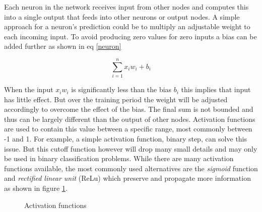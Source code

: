 \documentclass[proposal]{softeng}
\begin{document}
Each neuron in the network receives input from other nodes and computes this into a single output that feeds into other neurons or output nodes. A simple approach for a neuron's prediction could be to multiply an adjustable weight to each incoming input. To avoid producing zero values for zero inputs a bias can be added further as shown in eq  \ref{neuron}

\begin{equation}
\label{neuron}
 \sum_{i=1}^{n} {x_{i}} {w_{i}} + {b_{i}}  
\end{equation}



When the input \( {x_{i}} {w_{i}} \) is significantly less than the bias \({b_{i}}\) this implies that input has little effect. But over the training period the weight will be adjusted accordingly to overcome the effect of the bias. The final sum is not bounded and thus can be largely different than the output of other nodes. Activation functions are used to contain this value between a specific range, most commonly between -1 and 1. For example, a simple activation function, binary step, can solve this issue. But this cutoff function however will drop many small details and may only be used in binary classification problems. While there are many activation functions available, the most commonly used alternatives are the \textit{sigmoid} function and \textit{rectified linear unit} (ReLu) which preserve and propagate more information as shown in figure \ref{activation_funtions}. 

\begin{figure}
    \centering
    \caption{Activation functions \cite{activationfunction}}
    \label{activation_funtions}
\end{figure}
\end{document}

